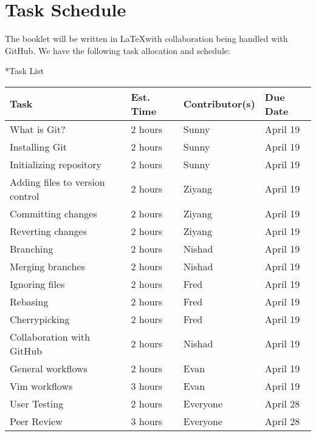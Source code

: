 \documentclass{amsart}
\makeatletter
\renewcommand\subsection{\@startsection{subsection}{2}%
  \z@{-.5\linespacing\@plus-.7\linespacing}{.5\linespacing}%
  {\normalfont\scshape}}
\makeatother
\begin{document}
\newpage
\section*{Task Schedule}

The booklet will be written in \LaTeX with collaboration being handled with GitHub.  We have the following task allocation and schedule:

\subsection*{Task List}
\begin{center}
\begin{tabular}{llll}
Task & Est. Time & Contributor(s) & Due Date\\
\hline
What is Git? & 2 hours & Sunny & April 19\\
Installing Git & 2 hours & Sunny & April 19\\
Initializing repository & 2 hours & Sunny & April 19\\
Adding files to version control & 2 hours & Ziyang & April 19\\
Committing changes & 2 hours & Ziyang & April 19\\
Reverting changes & 2 hours & Ziyang & April 19\\
Branching & 2 hours & Nishad & April 19\\
Merging branches & 2 hours & Nishad & April 19\\
Ignoring files & 2 hours & Fred & April 19\\
Rebasing & 2 hours & Fred & April 19\\
Cherrypicking & 2 hours & Fred & April 19\\
Collaboration with GitHub & 2 hours & Nishad & April 19\\
General workflows & 2 hours & Evan & April 19\\
Vim workflows & 3 hours & Evan & April 19\\
User Testing & 2 hours & Everyone & April 28\\
Peer Review & 3 hours & Everyone & April 28\\
\end{tabular}
\end{center}
\end{document}
